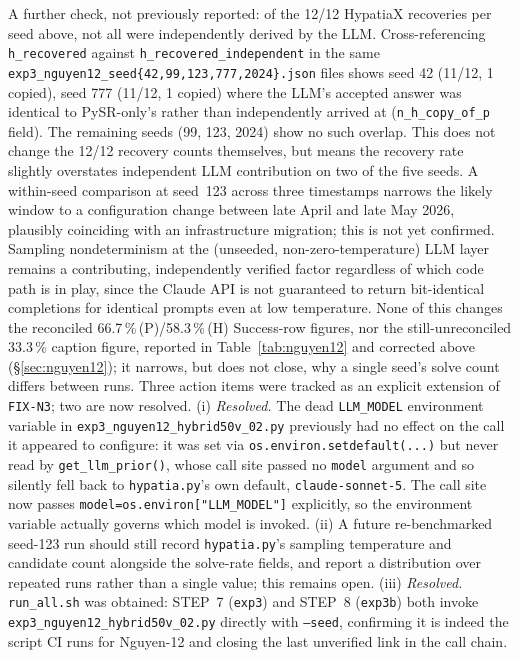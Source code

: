 \documentclass[twoside,11pt]{article}
\begin{document}
A further check, not previously reported: of the 12/12 HypatiaX recoveries per seed above, not all were independently derived by the LLM. Cross-referencing \texttt{h\_recovered} against \texttt{h\_recovered\_independent} in the same \texttt{exp3\_nguyen12\_seed\{42,99,123,777,2024\}.json} files shows seed 42 (11/12, 1 copied), seed 777 (11/12, 1 copied) where the LLM's accepted answer was identical to PySR-only's rather than independently arrived at (\texttt{n\_h\_copy\_of\_p} field). The remaining seeds (99, 123, 2024) show no such overlap. This does not change the 12/12 recovery counts themselves, but means the recovery rate slightly overstates independent LLM contribution on two of the five seeds.
A within-seed comparison at seed~123 across three
timestamps narrows the likely window to a configuration change between
late April and late May 2026, plausibly coinciding with an infrastructure
migration; this is not yet confirmed. Sampling nondeterminism at the
(unseeded, non-zero-temperature) LLM layer remains a contributing,
independently verified factor regardless of which code path is in play,
since the Claude API is not guaranteed to return bit-identical completions
for identical prompts even at low temperature. None of this changes the reconciled 66.7\,\%\,(P)/58.3\,\%\,(H) Success-row
figures, nor the still-unreconciled 33.3\,\% caption figure, reported in
Table~\ref{tab:nguyen12} and corrected above (\S\ref{sec:nguyen12}); it
narrows, but does not close, why a single seed's solve count differs
between runs. Three action items were tracked as an explicit extension of
\texttt{FIX-N3}; two are now resolved. (i) \emph{Resolved.} The dead
\texttt{LLM\_MODEL} environment variable in
\texttt{exp3\_nguyen12\_hybrid50v\_02.py} previously had no effect on
the call it appeared to configure: it was set via
\texttt{os.environ.setdefault(...)} but never read by
\texttt{get\_llm\_prior()}, whose call site passed no \texttt{model}
argument and so silently fell back to \texttt{hypatia.py}'s own default,
\texttt{claude-sonnet-5}. The call site now passes
\texttt{model=os.environ["LLM\_MODEL"]} explicitly, so the environment
variable actually governs which model is invoked. (ii) A future
re-benchmarked seed-123 run should still record \texttt{hypatia.py}'s
sampling temperature and candidate count alongside the solve-rate
fields, and report a distribution over repeated runs rather than a
single value; this remains open. (iii) \emph{Resolved.}
\texttt{run\_all.sh} was obtained: STEP~7 (\texttt{exp3}) and STEP~8
(\texttt{exp3b}) both invoke \texttt{exp3\_nguyen12\_hybrid50v\_02.py}
directly with \texttt{--seed}, confirming it is indeed the script CI
runs for Nguyen-12 and closing the last unverified link in the call
chain.
\end{document}
